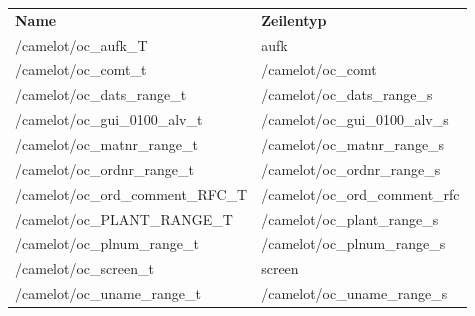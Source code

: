 \begin{tabu}{p{0.5\textwidth}p{0.46\textwidth }}
\rowfont{\bfseries\leavevmode\color{headingfont}}\textbf{Name} & \textbf{Zeilentyp} \\
/camelot/oc\_aufk\_T & aufk \\
/camelot/oc\_comt\_t & /camelot/oc\_comt \\
/camelot/oc\_dats\_range\_t & /camelot/oc\_dats\_range\_s \\
	/camelot/oc\_gui\_0100\_alv\_t & /camelot/oc\_gui\_0100\_alv\_s \\
/camelot/oc\_matnr\_range\_t & /camelot/oc\_matnr\_range\_s \\
/camelot/oc\_ordnr\_range\_t & /camelot/oc\_ordnr\_range\_s \\
/camelot/oc\_ord\_comment\_RFC\_T & /camelot/oc\_ord\_comment\_rfc \\
/camelot/oc\_PLANT\_RANGE\_T & /camelot/oc\_plant\_range\_s \\
/camelot/oc\_plnum\_range\_t & /camelot/oc\_plnum\_range\_s \\
/camelot/oc\_screen\_t & screen \\
/camelot/oc\_uname\_range\_t & /camelot/oc\_uname\_range\_s \\
\end{tabu}